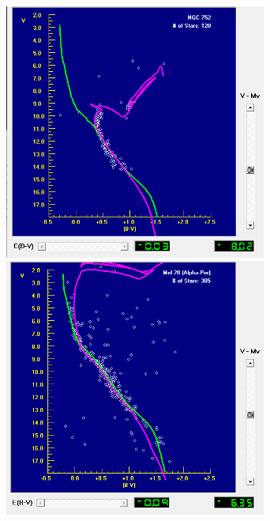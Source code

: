 \documentclass[12pt]{article}
\begin{document}
\begin{figure}[H]
    \includegraphics[width= 3.40in]{ngc752.png}
    \includegraphics[width= 3.40in]{mel20.png}
  \label{hrmetal}
\end{figure}
\end{document}
